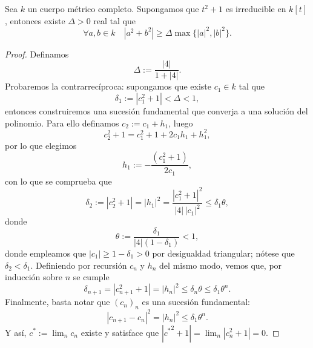 \documentclass[teoria-numeros.tex]{subfiles}
\begin{document}
\begin{lem}
	Sea $k$ un cuerpo métrico completo.
	Supongamos que $t^2 + 1$ es irreducible en $k[t]$, entonces existe $\Delta > 0$ real tal que
	$$ \forall a,b\in k \quad |a^2 + b^2| \ge \Delta \max\{ |a|^2, |b|^2 \}. $$
\end{lem}
\begin{proof}
	Definamos
	$$ \Delta := \frac{|4|}{1 + |4|}. $$
	Probaremos la contrarrecíproca: supongamos que existe $c_1 \in k$ tal que
	$$ \delta_1 := |c_1^2 + 1| < \Delta < 1, $$
	entonces construiremos una sucesión fundamental que converja a una solución del polinomio.
	Para ello definamos $c_2 := c_1 + h_1$, luego
	$$ c_2^2 + 1 = c_1^2 + 1 + 2c_1h_1 + h_1^2, $$
	por lo que elegimos
	$$ h_1 := -\frac{(c_1^2 + 1)}{2c_1}, $$
	con lo que se comprueba que
	$$ \delta_2 := |c_2^2 + 1| = |h_1|^2 = \frac{|c_1^2 + 1|^2}{|4|\,|c_1|^2} \le \delta_1 \theta, $$
	donde
	$$ \theta := \frac{\delta_1}{|4|(1 - \delta_1)} < 1, $$
	donde empleamos que $|c_1| \ge 1 - \delta_1 > 0$ por desigualdad triangular; nótese que $\delta_2 < \delta_1$.
	Definiendo por recursión $c_n$ y $h_n$ del mismo modo, vemos que, por inducción sobre $n$ se cumple
	$$ \delta_{n+1} = |c_{n+1}^2 + 1| = |h_n|^2 \le \delta_n \theta \le \delta_1 \theta^n. $$
	Finalmente, basta notar que $(c_n)_n$ es una sucesión fundamental:
	$$ |c_{n+1} - c_n|^2 = |h_n|^2 \le \delta_1 \theta^n. $$
	Y así, $c^* := \lim_n c_n$ existe y satisface que $|{c^*}^2 + 1| = \lim_n |c_n^2 + 1| = 0$.
\end{proof}
\end{document}

